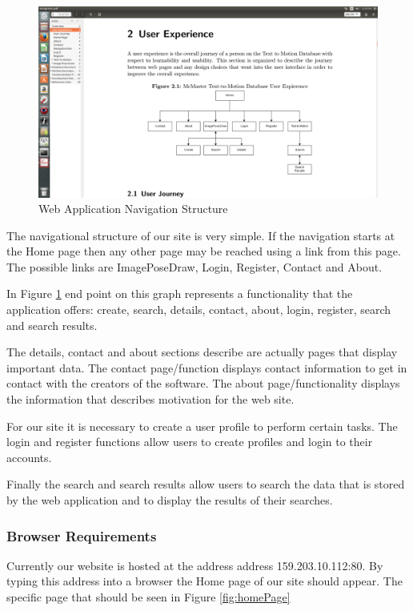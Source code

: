 \documentclass{scrreprt}
\begin{document}
\begin{figure}
  \includegraphics[width=\linewidth]{apppicture.png}
  \caption{Web Application Navigation Structure}
  \label{fig:navStruct}
\end{figure}

The navigational structure of our site is very simple.  If the navigation
starts at the Home page then any other page may be reached using a link from
this page.  The possible links are ImagePoseDraw, Login, Register, Contact and
About.

In Figure \ref{fig:navStruct} end point on this graph represents a
functionality that the application offers: create, search, details, contact,
about, login, register, search and search results.

The details, contact and about sections describe are actually pages that
display important data.  The contact page/function displays contact information
to get in contact with the creators of the software.  The about
page/functionality displays the information that describes motivation for the
web site.

For our site it is necessary to create a user profile to perform certain tasks.
The login and register functions allow users to create profiles and login to
their accounts.

Finally the search and search results allow users to search the data that is
stored by the web application and to display the results of their searches.

\subsubsection{Browser Requirements}

Currently our website is hosted at the address address 159.203.10.112:80. By
typing this address into a browser the Home page of our site should appear. The
specific page that should be seen in Figure \ref{fig:homePage}
\end{document}
